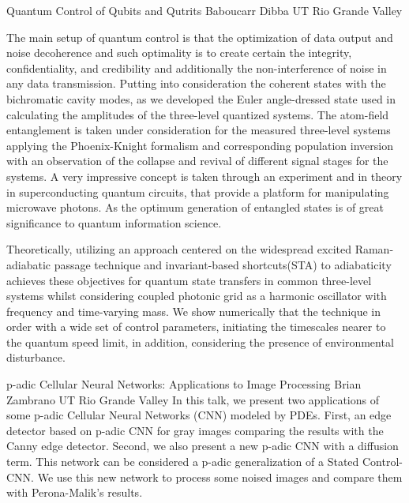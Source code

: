 \begin{addmargin}[2em]{0em}
\vspace{1.5ex}
\abs
{Quantum Control of Qubits and Qutrits}
{Baboucarr Dibba}
{UT Rio Grande Valley}
{The main setup of quantum control is that the optimization of data output and noise 
decoherence and such optimality is to create certain the integrity, confidentiality, and
credibility and additionally the non-interference of noise in any data transmission.
Putting into consideration the coherent states with the bichromatic cavity modes,
as we developed the Euler angle-dressed state used in calculating the amplitudes
of the three-level quantized systems. The atom-field entanglement is taken under
consideration for the measured three-level systems applying the Phoenix-Knight
formalism and corresponding population inversion with an observation of the collapse
and revival of different signal stages for the systems. A very impressive concept is
taken through an experiment and in theory in superconducting quantum circuits, that
provide a platform for manipulating microwave photons. As the optimum generation of
entangled states is of great significance to quantum information science.

Theoretically, utilizing an approach centered on the widespread excited Raman-adiabatic passage
technique and invariant-based shortcuts(STA) to adiabaticity achieves these objectives for quantum state transfers in common three-level systems whilst considering coupled photonic grid as a harmonic oscillator with frequency and time-varying mass. We show numerically that the technique in order with a wide set of control
parameters, initiating the timescales nearer to the quantum speed limit, in addition,
considering the presence of environmental disturbance.
}

\vspace{1.5ex}
\abs
{p-adic Cellular Neural Networks: Applications to Image Processing}
{Brian Zambrano}
{UT Rio Grande Valley}
{In this talk, we present two applications of some p-adic Cellular Neural Networks (CNN) modeled by PDEs. First, an edge detector based on p-adic CNN for gray images comparing the results with the Canny edge detector. Second, we also present a new p-adic CNN with a diffusion term. This network can be considered a p-adic generalization of a Stated Control- CNN.   We use this new network to process some noised images and compare them with Perona-Malik’s results.
}


\end{addmargin}
